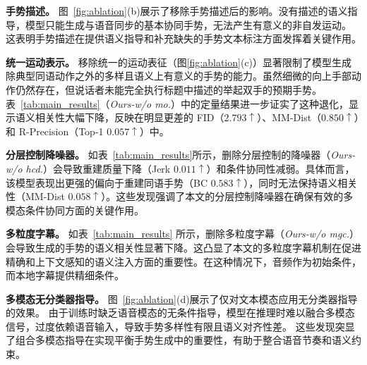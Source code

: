 \textbf{手势描述。}
图~\ref{fig:ablation}(b)展示了移除手势描述后的影响。没有描述的语义指导，模型只能生成与语音同步的基本协同手势，无法产生有意义的非自发运动。
这表明手势描述在提供语义指导和补充缺失的手势文本标注方面发挥着关键作用。

\textbf{统一运动表示。}
移除统一的运动表征（图\ref{fig:ablation}(c)）显著限制了模型生成除典型同语动作之外的多样且语义上有意义的手势的能力。虽然细微的向上手部动作仍然存在，但说话者未能完全执行标题中描述的举起双手的预期手势。
表~\ref{tab:main_results}（\textit{Ours-w/o mo.}）中的定量结果进一步证实了这种退化，显示语义相关性大幅下降，反映在明显更差的 FID（$2.793\uparrow$）、MM-Dist（$0.850\uparrow$）和 R-Precision（Top-1 $0.057\uparrow$）中。

\textbf{分层控制降噪器。} %
如表~\ref{tab:main_results}所示，删除分层控制的降噪器（\textit{Ours-w/o hcd.}）会导致重建质量下降（Jerk $0.011\uparrow$）和条件协同性减弱。具体而言，该模型表现出更强的偏向于重建同语手势（BC $0.583\uparrow$），同时无法保持语义相关性（MM-Dist $0.058\uparrow$）。这些发现强调了本文的分层控制降噪器在确保有效的多模态条件协同方面的关键作用。

\textbf{多粒度字幕。}
如表~\ref{tab:main_results} 所示，删除多粒度字幕（\textit{Ours-w/o mgc.}）会导致生成的手势的语义相关性显著下降。这凸显了本文的多粒度字幕机制在促进精确和上下文感知的语义注入方面的重要性。在这种情况下，音频作为初始条件，而本地字幕提供精细条件。

\textbf{多模态无分类器指导。}
图~\ref{fig:ablation}(d)展示了仅对文本模态应用无分类器指导的效果。
由于训练时缺乏语音模态的无条件指导，模型在推理时难以融合多模态信号，过度依赖语音输入，导致手势多样性有限且语义对齐性差。
这些发现突显了组合多模态指导在实现平衡手势生成中的重要性，有助于整合语音节奏和语义约束。

